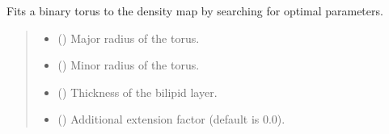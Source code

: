 \documentclass[letterpaper,10pt,english]{sphinxmanual}
\begin{document}
\begin{fulllineitems}
\begin{fulllineitems}
\begin{quote}
\begin{description}
\sphinxAtStartPar
{\hyperref[\detokenize{src:src.Torus.Torus}]{}}

\end{description}\end{quote}

\end{fulllineitems}


\begin{fulllineitems}
\label{\detokenize{src:src.BagelFitter.BagelFitter.generate_binary_torus}}
\pysigstartsignatures
{}
\pysigstopsignatures
\sphinxAtStartPar
Fits a binary torus to the density map by searching for optimal parameters.
\begin{quote}\begin{description}
\begin{itemize}
\item {} 
\sphinxAtStartPar
{} () \textendash{} Major radius of the torus.

\item {} 
\sphinxAtStartPar
{} () \textendash{} Minor radius of the torus.

\item {} 
\sphinxAtStartPar
{} () \textendash{} Thickness of the bilipid layer.

\item {} 
\sphinxAtStartPar
{} (\sphinxstyleliteralemphasis{\sphinxupquote{, }}) \textendash{} Additional extension factor (default is 0.0).


\end{itemize}
\end{description}
\end{quote}
\end{fulllineitems}
\end{fulllineitems}
\end{document}
